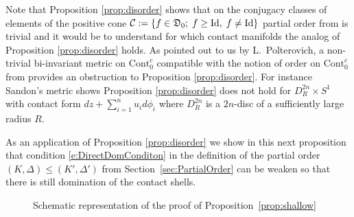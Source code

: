 \documentclass[12pt]{paper}
\let\oldmarginpar\marginpar
\renewcommand\marginpar[1]{\-\oldmarginpar[\raggedleft\footnotesize #1]%
{\raggedright\footnotesize #1}}
\theoremstyle{plain}
\theoremstyle{definition}
\newcommand{\p}{\partial}
\newcommand{\Id}{\mathrm {Id}}
\newcommand{\CCont}{\mathrm{Cont}}
\newcommand{\cD}{{\frak D}}
\newcommand{\CC}{\mathcal{C}}
\numberwithin{figure}{section}
\begin{document}
 Note that Proposition \ref{prop:disorder} shows that on the conjugacy classes of elements of the positive cone
 $\CC:=\{f\in\cD_0;\; f\geq\Id,\;f\neq\Id\}$ partial order from \cite{EliPolt00} is trivial
 and it would be to understand for which contact manifolds the analog of Proposition \ref{prop:disorder} holds.
 As pointed out to us by L.~Polterovich, a non-trivial bi-invariant metric on $\CCont_0^c$ compatible with the notion of order
 on $\CCont_0^c$ from \cite{EliPolt00} provides an obstruction to Proposition \ref{prop:disorder}.  For instance
 Sandon's metric \cite{Sandon} shows Proposition \ref{prop:disorder} does not hold for $D^{2n}_R\times S^1$ with contact form $dz+\sum_{i=1}^n u_id\phi_i$ where $D^{2n}_R$ is a $2n$-disc of a sufficiently large radius $R$.  
% 
 
 
 
As an application of  Proposition \ref{prop:disorder} we show in this next proposition
that condition \eqref{e:DirectDomConditon} in the definition of
the partial order $(K, \Delta) \leq (K', \Delta')$ from Section~\ref{sec:PartialOrder} can be weaken so that there is still
domination of the contact shells.

		\begin{figure}[h]
   \centering
   \def\svgwidth{400pt}
   
   \caption{Schematic representation of the proof of Proposition~\ref{prop:shallow}}
  \label{f:shallow}
\end{figure} 
\end{document}
